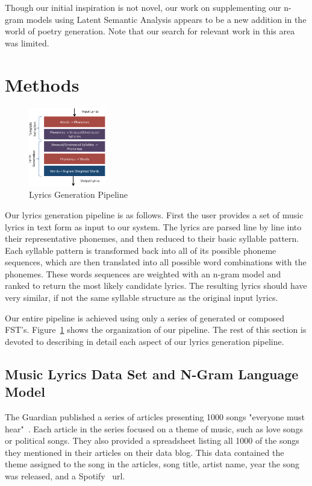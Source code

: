 \documentclass{vgtc}                          %
\begin{document}
Though our initial inspiration is not novel, our work on supplementing our n-gram
models using Latent Semantic Analysis appears to be a new addition
in the world of poetry generation. Note that our search for relevant work in this
area was limited.

\section{Methods}
\label{sec:methods}

\begin{figure}%
\centering
\includegraphics[width=0.3\textwidth]{images/ps/pipeline.ps}
\caption{Lyrics Generation Pipeline}
\label{fig:pipeline}
\end{figure}

Our lyrics generation pipeline is as follows. First the user provides
a set of music lyrics in text form as input to our system. The
lyrics are parsed line by line into their representative phonemes,
and then reduced to their basic syllable pattern.
Each syllable pattern is transformed back into all of its possible
phoneme sequences, which are then translated into all possible 
word combinations with the phonemes. These words sequences are weighted with
an n-gram model and ranked to return the most likely
candidate lyrics. The resulting lyrics should have very
similar, if not the same syllable structure as the original
input lyrics.

Our entire pipeline is achieved using only a series of
generated or composed FST's. Figure~\ref{fig:pipeline}
shows the organization of our pipeline.
The rest of this section is devoted to describing
in detail each aspect of our lyrics generation pipeline.

\subsection{Music Lyrics Data Set and N-Gram Language Model}
The Guardian published a series of articles presenting 1000 songs "everyone must hear"~\cite{guardian}.
Each article in the series focused on a theme of music, such as love songs or political songs.
They also provided a spreadsheet listing all 1000 of the songs they mentioned in their articles
on their data blog\cite{guardian2}. This
data contained the theme assigned to the song in the articles,
song title, artist name, year the song was released, and a Spotify~\cite{spotify} url.
\end{document}
